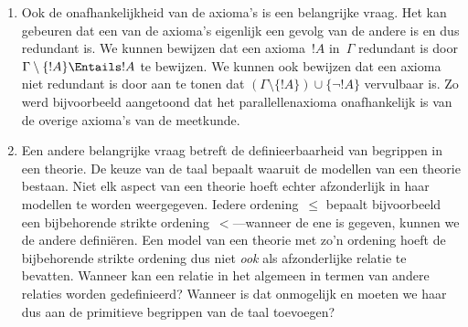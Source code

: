\documentclass[../../../include/open-logic-section]{subfiles}
\begin{document}
\begin{explain}
\begin{enumerate}
  en hebben we een incoherente theorie opgezet. Dat dit niet gebeurt,
  kunnen we verifiëren door een model van~$\Gamma$ te vinden. Als onze
  theorie modellen heeft, kunnen we die bovendien met logische methoden
  onderzoeken en construeren.
\item Ook de onafhankelijkheid van de axioma's is een belangrijke
  vraag. Het kan gebeuren dat een van de axioma's eigenlijk een gevolg
  van de andere is en dus redundant is. We kunnen bewijzen dat een
  axioma~$!A$ in~$\Gamma$ redundant is door
  $\Gamma \setminus \{!A\} \Entails !A$ te bewijzen. We kunnen ook
  bewijzen dat een axioma niet redundant is door aan te tonen dat
  $(\Gamma \setminus \{!A\}) \cup \{\lnot !A\}$ vervulbaar is. Zo
  werd bijvoorbeeld aangetoond dat het parallellenaxioma onafhankelijk
  is van de overige axioma's van de meetkunde.
\item Een andere belangrijke vraag betreft de definieerbaarheid van
  begrippen in een theorie. De keuze van de taal bepaalt waaruit de
  modellen van een theorie bestaan. Niet elk aspect van een theorie
  hoeft echter afzonderlijk in haar modellen te worden weergegeven.
  Iedere ordening~$\le$ bepaalt bijvoorbeeld een bijbehorende strikte
  ordening~$<$---wanneer de ene is gegeven, kunnen we de andere
  definiëren. Een model van een theorie met zo'n ordening hoeft de
  bijbehorende strikte ordening dus niet \emph{ook} als afzonderlijke
  relatie te bevatten. Wanneer kan een relatie in het algemeen in
  termen van andere relaties worden gedefinieerd? Wanneer is dat
  onmogelijk en moeten we haar dus aan de primitieve begrippen van de
  taal toevoegen?
\end{enumerate}
\end{explain}
\end{document}

